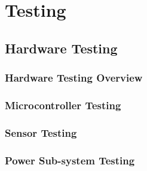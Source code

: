 \section{Testing}
    \subsection{Hardware Testing}
    \subsubsection{Hardware Testing Overview}
    \subsubsection{Microcontroller Testing}
    \subsubsection{Sensor Testing}
    \subsubsection{Power Sub-system Testing}

